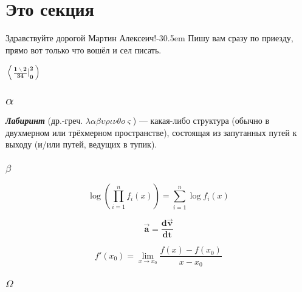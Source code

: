\documentclass{article}
\begin{document}
    \section{Это секция}
    {\LARGE Здравствуйте дорогой Мартин Алексеич!}\kern-30.5em
    {\footnotesize Пишу вам сразу по приезду, прямо вот только что вошёл и сел писать.}

    \begin{flushright}
        $
        \boldsymbol{
            \left\langle
            \frac{1\backslash2}{34}\Big|_0^2
            \right)
        }
        $
    \end{flushright}

    \subsection{$\alpha$}
    \textbf{\textit{Лабиринт}} (др.-греч. $\lambda\alpha\beta\upsilon\rho\iota\nu\theta o \varsigma$) ---
    какая-либо структура (обычно в двухмерном или трёхмерном пространстве), состоящая из запутанных путей
    к выходу (и/или путей, ведущих в тупик). 
    \subsubsection{$\beta$}

    \begin{multicols}{3}

    $$\log\left(
    \prod_{i=1}^{n} f_i(x)
    \right) =
    \sum\limits_{i=1}^{n} \log f_i(x)
    $$

    $$\pmb{\vec{a} = \frac{d\vec{v}}{dt}}$$

    $$f'(x_0) = \lim_{x \to x_0} \frac{f(x) - f(x_0)}{x - x_0}$$
    \end{multicols}

    \subsubsection{$\Omega$}
    \begin{multicols}{2}
        \lipsum[1-2]
    \end{multicols}
\end{document}
